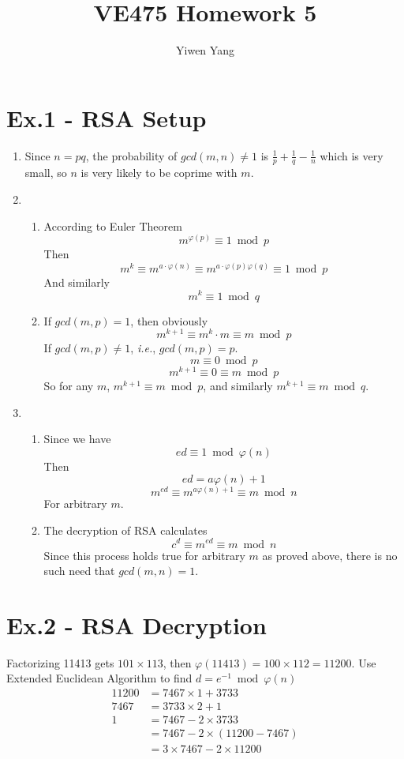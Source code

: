 \documentclass[12pt]{article}
\title{VE475 Homework 5}
\author{Yiwen Yang}
\begin{document}
\date{}
\maketitle

\section*{Ex.1 - RSA Setup}

	\begin{enumerate}
		\item
			Since $n=pq$, the probability of $gcd(m,n)\not=1$ is $\frac{1}{p}+\frac{1}{q}-\frac{1}{n}$ which is very small, so $n$ is very likely to be coprime with $m$.
		\item
			\begin{enumerate}
				\item
					According to Euler Theorem
					$$m^{\varphi(p)}\equiv 1 \bmod p$$
					Then
					$$m^{k}\equiv m^{a\cdot \varphi(n)}\equiv m^{a\cdot \varphi(p)\varphi(q)}\equiv  1 \bmod p$$
					And similarly
					$$m^{k}\equiv 1 \bmod q$$
				\item
					If $gcd(m,p)=1$, then obviously
					$$m^{k+1}\equiv m^k\cdot m\equiv m \bmod p$$
					If $gcd(m,p)\not=1$, \textit{i.e.}, $gcd(m,p)=p$.
					$$m\equiv 0 \bmod p$$
					$$m^{k+1}\equiv 0\equiv m \bmod p$$
					So for any $m$, $m^{k+1}\equiv m \bmod p$, and similarly $m^{k+1}\equiv m \bmod q$.
			\end{enumerate}
		\item
			\begin{enumerate}
				\item
					Since we have
					$$ed\equiv 1 \bmod \varphi(n)$$
					Then
					$$ed=a\varphi(n)+1$$
					$$m^{ed}\equiv m^{a\varphi(n)+1}\equiv m \bmod n$$
					For arbitrary $m$.
				\item
					The decryption of RSA calculates
					$$c^d\equiv m^{ed}\equiv m \bmod n$$
					Since this process holds true for arbitrary $m$ as proved above, there is no such need that $gcd(m,n)=1$.
			\end{enumerate}
	\end{enumerate}

\section*{Ex.2 - RSA Decryption}

	Factorizing 11413 gets $101\times113$, then $\varphi(11413)=100\times112=11200$. Use Extended Euclidean Algorithm to find $d=e^{-1}\bmod \varphi(n)$
	\begin{align*}
		11200&=7467\times1+3733\\
		7467&=3733\times2+1\\
		1&=7467-2\times3733\\
		&=7467-2\times(11200-7467)\\
		&=3\times7467-2\times11200
	\end{align*}
\end{document}
